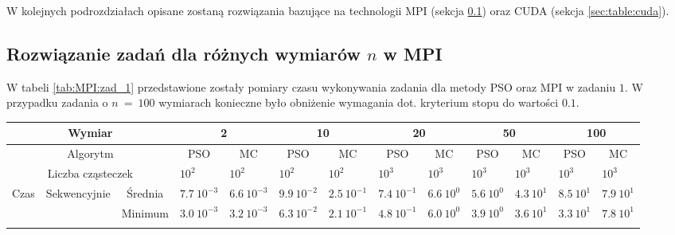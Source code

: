 \documentclass[11pt, a4paper, oneside]{article}
\begin{document}
W kolejnych podrozdziałach opisane zostaną rozwiązania bazujące na technologii MPI (sekcja \ref{sec:table:mpi}) oraz CUDA (sekcja \ref{sec:table:cuda}).

\subsection{Rozwiązanie zadań dla różnych wymiarów $n$ w MPI} \label{sec:table:mpi}

W tabeli \ref{tab:MPI:zad_1} przedstawione zostały pomiary czasu wykonywania zadania dla metody PSO oraz MPI w zadaniu $1$. W przypadku zadania o $n \ = \ 100$ wymiarach konieczne było obniżenie wymagania dot. kryterium stopu do wartości $0.1$.

\renewcommand{\arraystretch}{2}
\begin{table}[t]
\scriptsize
\begin{adjustwidth}{-1.76cm}{}
\centering
\begin{tabular}{|c|c|c|l|l|l|l|l|l|l|l|l|l|}
\hline
\multicolumn{3}{|c|}{Wymiar}                                      & \multicolumn{2}{c|}{2}                             & \multicolumn{2}{c|}{10}                            & \multicolumn{2}{c|}{20}                            & \multicolumn{2}{c|}{50}                            & \multicolumn{2}{c|}{100}                           \\ \hline
\multicolumn{3}{|c|}{Algorytm}                                    & \multicolumn{1}{c|}{PSO} & \multicolumn{1}{c|}{MC} & \multicolumn{1}{c|}{PSO} & \multicolumn{1}{c|}{MC} & \multicolumn{1}{c|}{PSO} & \multicolumn{1}{c|}{MC} & \multicolumn{1}{c|}{PSO} & \multicolumn{1}{c|}{MC} & \multicolumn{1}{c|}{PSO} & \multicolumn{1}{c|}{MC} \\ \hline
\multicolumn{3}{|c|}{Liczba cząsteczek}                           & $10^{2}$                 & $10^{2}$                & $10^{2}$                 & $10^{2}$                & $10^{3}$                 & $10^{3}$                & $10^{3}$                 & $10^{3}$                & $10^{3}$                 & $10^{3}$                \\ \hline
\multirow{8}{*}{Czas} & \multirow{4}{*}{Sekwencyjnie} & Średnia   & $7.7 \ 10^{-3}$          & $6.6 \ 10^{-3}$         & $9.9 \ 10^{-2}$          & $2.5 \ 10^{-1}$         & $7.4 \ 10^{-1}$          & $6.6 \ 10^{0}$          & $5.6 \ 10^{0}$           & $4.3 \ 10^{1}$          & $8.5 \ 10^{1}$           & $7.9 \ 10^{1}$          \\ \cline{3-13} 
                      &                               & Minimum   & $3.0 \ 10^{-3}$          & $3.2 \ 10^{-3}$         & $6.3 \ 10^{-2}$          & $2.1 \ 10^{-1}$         & $4.8 \ 10^{-1}$          & $6.0 \ 10^{0}$          & $3.9 \ 10^{0}$           & $3.6 \ 10^{1}$          & $3.3 \ 10^{1}$           & $7.8 \ 10^{1}$          \\ \cline{3-13} 

\end{tabular}
\end{adjustwidth}
\end{table}
\end{document}
